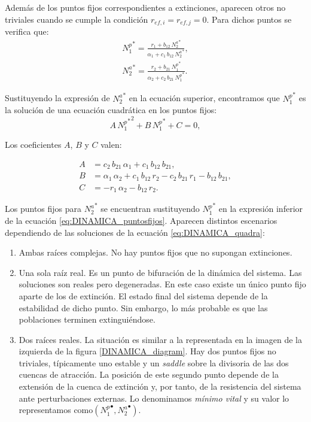 Además de los puntos fijos correspondientes a extinciones, aparecen otros no triviales cuando se cumple la condición $r_{ef,i} = r_{ef,j} = 0$. Para dichos puntos se verifica que: 
\begin{align}
{N^p_{1}}^* = \frac{ r_{1}+ b_{12} \, {N^a_{2}}^* }{\alpha_{1}+ c_{1}\, b_{12}\, {N^a_{2}}^* } , \nonumber\\ 
{N^a_{2}}^* = \frac{ r_{2}+ b_{21}\, {N^p_{1}}^* }{\alpha_{2}+ c_{2} \, b_{21}\, {N^p_{1}}^* } .
\label{eq:DINAMICA_puntosfijos}
\end{align}

Sustituyendo la expresión de ${N^{a}_2}^*$ en la ecuación superior, encontramos que ${N^p_1}^*$ es la solución de una ecuación cuadrática en los puntos fijos: 
\begin{equation}
A\, {{N^p_1}^*}^2 + B \, {N^p_1}^* + C=0 ,
\label{eq:DINAMICA_quadra}
\end{equation}

Los coeficientes $A$, $B$ y $C$ valen:

\begin{align}
\displaystyle A &= c_{2}\, b_{21}\, \alpha_{1}+c_{1}\, b_{12}\, b_{21} , \nonumber \\
\displaystyle B &= \alpha_{1}\, \alpha_{2}+ c_{1}\, b_{12}\, r_{2} - c_{2}\, b_{21}\, r_{1} - b_{12}\, b_{21} ,\nonumber\\
\displaystyle C &= - r _{1}\, \alpha_{2} - b_{12}\, r_{2} .
\label{eq:DINAMICA_puntos_n1}
\end{align}

Los puntos fijos para ${N^a_2}^*$ se encuentran sustituyendo ${N^p_1}^*$ en la expresión inferior de la ecuación \ref{eq:DINAMICA_puntosfijos}. Aparecen distintos escenarios dependiendo de las soluciones de la ecuación \ref{eq:DINAMICA_quadra}:

\begin{enumerate}
\item Ambas raíces complejas. No hay puntos fijos que no supongan extinciones.
\item Una sola raíz real. Es un punto de bifuración de la dinámica del sistema. Las soluciones son reales pero degeneradas. En este caso existe un único punto fijo aparte de los de extinción. El estado final del sistema depende de la estabilidad de dicho punto. Sin embargo, lo más probable es que las poblaciones terminen extinguiéndose.
\item Dos raíces reales. La situación es similar a la representada en la imagen de la izquierda de la figura \ref{DINAMICA_diagram}. Hay dos puntos fijos no triviales, típicamente uno estable y un \textit{saddle} sobre la divisoria de las dos cuencas de atracción. La posición de este segundo punto depende de la extensión de la cuenca de extinción y, por tanto, de la resistencia del sistema ante perturbaciones externas. Lo denominamos \textit{mínimo vital} y su valor lo representamos como$({N_{1}^{p}}^\bullet,{N_{2}^{a}}^\bullet)$.
\end{enumerate}

